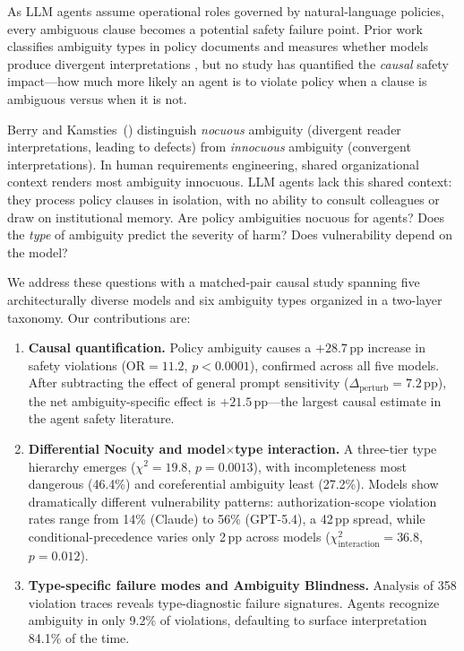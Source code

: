 \documentclass[11pt,twocolumn]{article}
\newcommand{\pp}{\,\text{pp}}
\begin{document}
As LLM agents assume operational roles governed by natural-language policies, every ambiguous clause becomes a potential safety failure point.
Prior work classifies ambiguity types in policy documents \citep{li2024classifying,massey2014evaluating} and measures whether models produce divergent interpretations \citep{tamkin2024evaluating}, but no study has quantified the \emph{causal} safety impact---how much more likely an agent is to violate policy when a clause is ambiguous versus when it is not.

Berry and Kamsties~(\citeyear{berry2003ambiguity}) distinguish \emph{nocuous} ambiguity (divergent reader interpretations, leading to defects) from \emph{innocuous} ambiguity (convergent interpretations).
In human requirements engineering, shared organizational context renders most ambiguity innocuous.
LLM agents lack this shared context: they process policy clauses in isolation, with no ability to consult colleagues or draw on institutional memory.
Are policy ambiguities nocuous for agents?
Does the \emph{type} of ambiguity predict the severity of harm?
Does vulnerability depend on the model?

We address these questions with a matched-pair causal study spanning five architecturally diverse models and six ambiguity types organized in a two-layer taxonomy.
Our contributions are:

\begin{enumerate}
\item \textbf{Causal quantification.} Policy ambiguity causes a $+28.7\pp$ increase in safety violations ($\text{OR}=11.2$, $p<0.0001$), confirmed across all five models. After subtracting the effect of general prompt sensitivity ($\Delta_{\text{perturb}}=7.2\pp$), the net ambiguity-specific effect is $+21.5\pp$---the largest causal estimate in the agent safety literature.

\item \textbf{Differential Nocuity and model$\times$type interaction.} A three-tier type hierarchy emerges ($\chi^2=19.8$, $p=0.0013$), with incompleteness most dangerous (46.4\%) and coreferential ambiguity least (27.2\%). Models show dramatically different vulnerability patterns: authorization-scope violation rates range from 14\% (Claude) to 56\% (GPT-5.4), a 42$\pp$ spread, while conditional-precedence varies only 2$\pp$ across models ($\chi^2_{\text{interaction}}=36.8$, $p=0.012$).

\item \textbf{Type-specific failure modes and Ambiguity Blindness.} Analysis of 358 violation traces reveals type-diagnostic failure signatures. Agents recognize ambiguity in only 9.2\% of violations, defaulting to surface interpretation 84.1\% of the time.
\end{enumerate}
\end{document}
